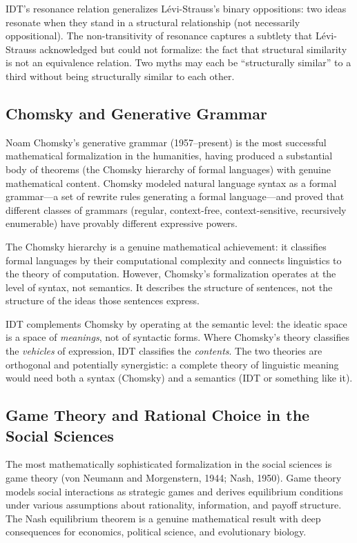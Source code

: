 \documentclass[11pt,openany]{book}
\theoremstyle{definition}
\theoremstyle{plain}
\theoremstyle{remark}
\begin{document}
IDT's resonance relation generalizes Lévi-Strauss's binary oppositions: two ideas resonate when they stand in a structural relationship (not necessarily oppositional). The non-transitivity of resonance captures a subtlety that Lévi-Strauss acknowledged but could not formalize: the fact that structural similarity is not an equivalence relation. Two myths may each be ``structurally similar'' to a third without being structurally similar to each other.

\subsection{Chomsky and Generative Grammar}

Noam Chomsky's generative grammar (1957--present) is the most successful mathematical formalization in the humanities, having produced a substantial body of theorems (the Chomsky hierarchy of formal languages) with genuine mathematical content. Chomsky modeled natural language syntax as a formal grammar---a set of rewrite rules generating a formal language---and proved that different classes of grammars (regular, context-free, context-sensitive, recursively enumerable) have provably different expressive powers.

The Chomsky hierarchy is a genuine mathematical achievement: it classifies formal languages by their computational complexity and connects linguistics to the theory of computation. However, Chomsky's formalization operates at the level of syntax, not semantics. It describes the structure of sentences, not the structure of the ideas those sentences express.

IDT complements Chomsky by operating at the semantic level: the ideatic space is a space of \emph{meanings}, not of syntactic forms. Where Chomsky's theory classifies the \emph{vehicles} of expression, IDT classifies the \emph{contents}. The two theories are orthogonal and potentially synergistic: a complete theory of linguistic meaning would need both a syntax (Chomsky) and a semantics (IDT or something like it).

\subsection{Game Theory and Rational Choice in the Social Sciences}

The most mathematically sophisticated formalization in the social sciences is game theory (von Neumann and Morgenstern, 1944; Nash, 1950). Game theory models social interactions as strategic games and derives equilibrium conditions under various assumptions about rationality, information, and payoff structure. The Nash equilibrium theorem is a genuine mathematical result with deep consequences for economics, political science, and evolutionary biology.
\end{document}
